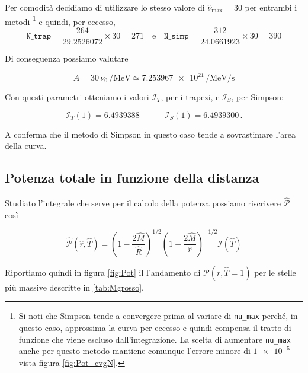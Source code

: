 \documentclass[a4paper, titlepage]{article}
\begin{document}
Per comodità decidiamo di utilizzare lo stesso valore di $\hat \nu_\text{max} = 30$ per entrambi i metodi 
\footnote{Si noti che Simpson tende a convergere prima al variare di \texttt{nu\_max} perché, in questo caso, approssima la curva per eccesso e quindi compensa il tratto di funzione che viene escluso dall'integrazione.
La scelta di aumentare \texttt{nu\_max} anche per questo metodo mantiene comunque l'errore minore di $\num{1e-5}$ vista figura \ref{fig:Pot_cvgN}.}
e quindi, per eccesso, 
\begin{equation}
    \texttt{N\_trap} = \frac{264}{29.2526072} \times 30 = 271
    \quad \text{e} \quad
    \texttt{N\_simp} = \frac{312}{24.0661923} \times 30 = 390
\end{equation}

Di conseguenza possiamo valutare

\begin{equation}
    A = 30 \, \nu_0 \, \unit{\per\mega\electronvolt} \simeq \num{7.253967e21} \, \unit{\per\mega\electronvolt\per\second}
    \label{eq:A_giusto}
\end{equation}

Con questi parametri otteniamo i valori $\mathcal I_T$, per i trapezi, e $\mathcal I_S$, per Simpson:

\begin{equation}
    \mathcal I_T (1) = 6.4939388
    \quad \quad \quad
    \mathcal I_S (1) = 6.4939300 \, .
    \label{eq:val_I}
\end{equation}

A conferma che il metodo di Simpson in questo caso tende a sovrastimare l'area della curva.


\subsection{Potenza totale in funzione della distanza}

Studiato l'integrale che serve per il calcolo della potenza possiamo riscrivere $\mathcal{\hat P}$ così

\begin{equation}
    \mathcal{\hat P} (\hat r, \hat T) = \left(1 - \frac{2 \hat M}{\hat R} \right)^{1/2} \left(1 - \frac{2 \hat M}{\hat r} \right)^{-1/2} \mathcal I (\hat T)
    \label{eq:Pot_I}
\end{equation}

Riportiamo quindi in figura \ref{fig:Pot} il l'andamento di $\mathcal P (r, \hat T = 1)$ per le stelle più massive descritte in \ref{tab:Mgrosso}.
\end{document}
